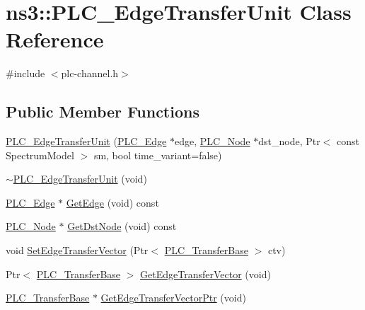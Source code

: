 \hypertarget{classns3_1_1PLC__EdgeTransferUnit}{\section{ns3\-:\-:\-P\-L\-C\-\_\-\-Edge\-Transfer\-Unit \-Class \-Reference}
\label{classns3_1_1PLC__EdgeTransferUnit}
}


{\ttfamily \#include $<$plc-\/channel.\-h$>$}

\subsection*{\-Public \-Member \-Functions}
\begin{DoxyCompactItemize}
\item 
\hyperlink{classns3_1_1PLC__EdgeTransferUnit_a9c00b33a2ee8d4cbfa4c8b8494cd72c2}{\-P\-L\-C\-\_\-\-Edge\-Transfer\-Unit} (\hyperlink{classns3_1_1PLC__Edge}{\-P\-L\-C\-\_\-\-Edge} $\ast$edge, \hyperlink{classns3_1_1PLC__Node}{\-P\-L\-C\-\_\-\-Node} $\ast$dst\-\_\-node, \-Ptr$<$ const \-Spectrum\-Model $>$ sm, bool time\-\_\-variant=false)
\item 
\hyperlink{classns3_1_1PLC__EdgeTransferUnit_aa0a67c9ed8d62feb12b3d5ae9596238a}{$\sim$\-P\-L\-C\-\_\-\-Edge\-Transfer\-Unit} (void)
\item 
\hyperlink{classns3_1_1PLC__Edge}{\-P\-L\-C\-\_\-\-Edge} $\ast$ \hyperlink{classns3_1_1PLC__EdgeTransferUnit_aa4a79f531e6ff0a56da73af53dc711dd}{\-Get\-Edge} (void) const 
\item 
\hyperlink{classns3_1_1PLC__Node}{\-P\-L\-C\-\_\-\-Node} $\ast$ \hyperlink{classns3_1_1PLC__EdgeTransferUnit_a63ba9dd1d244f74d2433a2693f68fd4c}{\-Get\-Dst\-Node} (void) const 
\item 
void \hyperlink{classns3_1_1PLC__EdgeTransferUnit_aff946ecb860942cba79ce26c340b83e0}{\-Set\-Edge\-Transfer\-Vector} (\-Ptr$<$ \hyperlink{classns3_1_1PLC__ValueBase}{\-P\-L\-C\-\_\-\-Transfer\-Base} $>$ ctv)
\item 
\-Ptr$<$ \hyperlink{classns3_1_1PLC__ValueBase}{\-P\-L\-C\-\_\-\-Transfer\-Base} $>$ \hyperlink{classns3_1_1PLC__EdgeTransferUnit_a7db518fc0ca26326b68054d4679fc7ab}{\-Get\-Edge\-Transfer\-Vector} (void)
\item 
\hyperlink{classns3_1_1PLC__ValueBase}{\-P\-L\-C\-\_\-\-Transfer\-Base} $\ast$ \hyperlink{classns3_1_1PLC__EdgeTransferUnit_afbaead46b8d608d9a79a341ca048d829}{\-Get\-Edge\-Transfer\-Vector\-Ptr} (void)
\item 

\end{DoxyCompactItemize}
